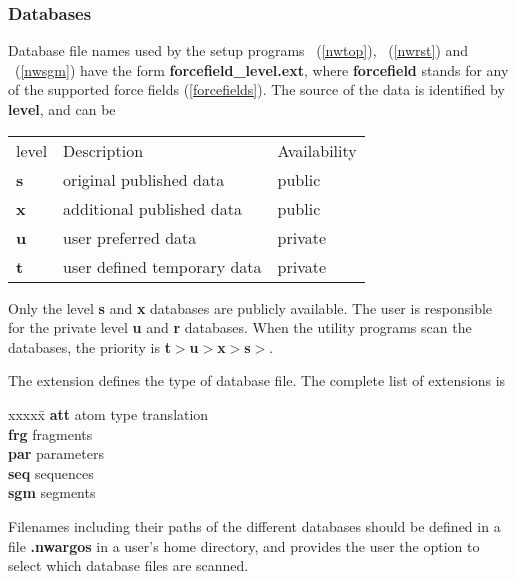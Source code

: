 \subsubsection{Databases}
Database file names used by the setup programs \nwtop\ (\ref{nwtop}), 
\nwrst\ (\ref{nwrst}) and \nwsgm\ (\ref{nwsgm}) have the form
{\bf forcefield\_level.ext}, where {\bf forcefield} stands for any of the
supported force fields (\ref{forcefields}). The source of the data is 
identified by {\bf level}, and can be 
\begin{center}
\begin{tabular}{lll}
\hline
level   & Description                 & Availability \\
{\bf s} & original published data     & public       \\
{\bf x} & additional published data   & public       \\
{\bf u} & user preferred data         & private      \\
{\bf t} & user defined temporary data & private    \\
\hline
\end{tabular}
\end{center}
\par
Only the level {\bf s} and {\bf x} databases are publicly available. 
The user is responsible for the private level {\bf u} and {\bf r}
databases. When the utility programs scan the databases, the priority
is {\bf t}$>${\bf u}$>${\bf x}$>${\bf s}$>$.
\par
The extension defines the type of database file. The complete list of
extensions is
\begin{tabbing}
xxxxx\=\kill
{\bf att} \> atom type translation\\
{\bf frg} \> fragments\\
{\bf par} \> parameters\\
{\bf seq} \> sequences\\
{\bf sgm} \> segments\\
\end{tabbing} 
\par
Filenames including their paths of the different databases should be 
defined in a file 
{\bf .nwargos} in a user's home directory, and provides the user the
option to select which database files are scanned.
